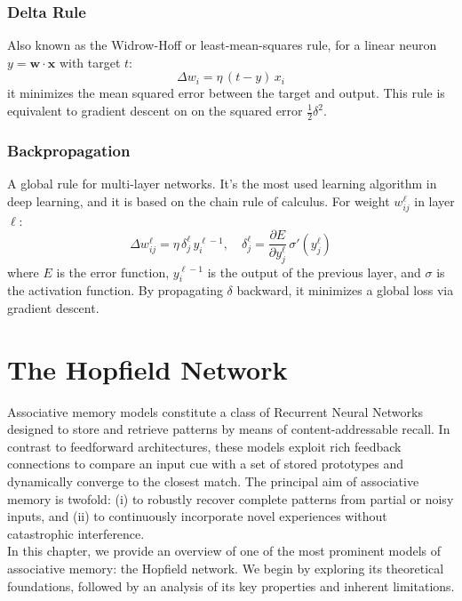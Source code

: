 \documentclass[a4paper,12pt]{report}
\begin{document}
\subsection*{Delta Rule}
Also known as the Widrow-Hoff or least-mean-squares rule, for a linear neuron $y=\mathbf{w}\cdot\mathbf{x}$ 
with target $t$:
\[
  \Delta w_i = \eta\,\left(t - y\right)\,x_i
\]
it minimizes the mean squared error between the target and output. This rule is equivalent to gradient 
descent on on the squared error $\frac12\delta^2$.

\subsection*{Backpropagation}
A global rule for multi-layer networks. It's the most used learning algorithm in deep learning,
and it is based on the chain rule of calculus. For weight $w_{ij}^\ell$ in layer $\ell$:
\[
  \Delta w_{ij}^\ell = \eta\,\delta_j^\ell\,y_i^{\ell-1},\quad \delta_j^\ell = \frac{\partial E}{\partial y_j^\ell}\,\sigma'(y_j^\ell)
\]
where $E$ is the error function, $y_i^{\ell-1}$ is the output of the previous layer, and $\sigma$ is the
activation function.
By propagating $\delta$ backward, it minimizes a global loss via gradient descent.







\chapter{The Hopfield Network}
Associative memory models constitute a class of Recurrent Neural Networks designed to 
store and retrieve patterns by means of content-addressable recall. In contrast to 
feedforward architectures, these models exploit rich feedback connections to compare an 
input cue with a set of stored prototypes and dynamically converge to the closest match. 
The principal aim of associative memory is twofold: (i) to robustly recover complete 
patterns from partial or noisy inputs, and (ii) to continuously incorporate novel 
experiences without catastrophic interference. \\
In this chapter, we provide an overview of one of the most prominent models 
of associative memory: the Hopfield network. We begin by exploring its theoretical 
foundations, followed by an analysis of its key properties and inherent limitations.
\end{document}

